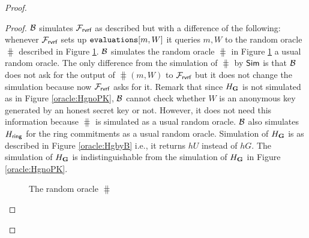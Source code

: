 \begin{proof}
\begin{proof}
			$ \mathcal{B} $ simulates $ \mathcal{F}_{\textsf{rvrf}} $ as described but with a difference of the following: whenever $ \mathcal{F}_{\textsf{rvrf}} $ sets up $ \texttt{evaluations}[m,W] $ it queries $ m,W $ to the random oracle $ \hash $ described in Figure \ref{oracle:HbyB}. $ \mathcal{B} $ simulates the random oracle $ \hash $ in Figure \ref{oracle:HbyB} a usual random oracle.
			The only difference from the simulation of $ \hash $ by $ \mathsf{Sim} $ is that $ \mathcal{B} $ does not ask for the output of $ \hash(m,W) $ to $ \mathcal{F}_{\textsf{rvrf}} $ but it does not change the simulation because now $\mathcal{F}_{\textsf{rvrf}} $ asks for it.  Remark that since $ H_{\mathbf{G}} $ is not simulated as in Figure \ref{oracle:HgnoPK}, $ \mathcal{B} $ cannot check whether $ W $ is an anonymous key generated by an honest secret key or not.  However, it does not need this information because $ \hash $ is simulated as a usual random oracle. $ \mathcal{B} $ also simulates $ H_\mathsf{ring} $ for the ring commitments as a usual random oracle. 			
			Simulation of $ H_{\mathbf{G}} $ is as described in Figure \ref{oracle:HgbyB} i.e., it returns $ hU $ instead of $ hG $. The simulation of $ H_{\mathbf{G}} $ is indistinguishable from the simulation of $ H_{\mathbf{G}} $ in Figure \ref{oracle:HgnoPK}. 
			
			\begin{figure}
				\centering
				
				\noindent{}	
				\caption{The random oracle $ \hash $}
				\label{oracle:HbyB}
			\end{figure}
			
			\begin{figure}
				\centering
				
				\noindent{}
\end{figure}
\end{proof}
\end{proof}
